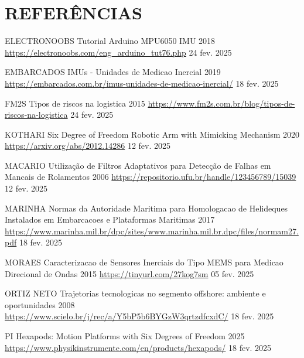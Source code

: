 \newpage

\pagestyle{modeloReferencias}


\section*{REFERÊNCIAS}
\vspace{-1cm}

    {ELECTRONOOBS}
    {Tutorial Arduino MPU6050 IMU}
    {2018}
    {\url{https://electronoobs.com/eng_arduino_tut76.php}}
    {24 fev. 2025}

    {EMBARCADOS}
    {IMUs - Unidades de Medicao Inercial}
    {2019}
    {\url{https://embarcados.com.br/imus-unidades-de-medicao-inercial/}}
    {18 fev. 2025}

    {FM2S}
    {Tipos de riscos na logistica}
    {2015}
    {\url{https://www.fm2s.com.br/blog/tipos-de-riscos-na-logistica}}
    {24 fev. 2025}

    {KOTHARI}
    {Six Degree of Freedom Robotic Arm with Mimicking Mechanism}
    {2020}
    {\url{https://arxiv.org/abs/2012.14286}}
    {12 fev. 2025}

    {MACARIO}
    {Utilização de Filtros Adaptativos para Detecção de Falhas em Mancais de Rolamentos}
    {2006}
    {\url{https://repositorio.ufu.br/handle/123456789/15039}}
    {12 fev. 2025}

    {MARINHA}
    {Normas da Autoridade Maritima para Homologacao de Helideques Instalados em Embarcacoes e Plataformas Maritimas}
    {2017}
    {\url{https://www.marinha.mil.br/dpc/sites/www.marinha.mil.br.dpc/files/normam27.pdf}}
    {18 fev. 2025}

    {MORAES}
    {Caracterizacao de Sensores Inerciais do Tipo MEMS para Medicao Direcional de Ondas}
    {2015}
    {\url{https://tinyurl.com/27kog7sm}}
    {05 fev. 2025}

    {ORTIZ NETO}
    {Trajetorias tecnologicas no segmento offshore: ambiente e oportunidades}
    {2008}
    {\url{https://www.scielo.br/j/rec/a/Y5bP5b6BYGzW3qrtzdfcxdC/}}
    {18 fev. 2025}

    {PI}
    {Hexapods: Motion Platforms with Six Degrees of Freedom}
    {2025}
    {\url{https://www.physikinstrumente.com/en/products/hexapods/}}
    {18 fev. 2025}


